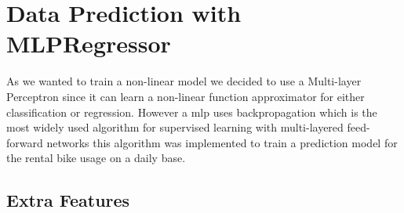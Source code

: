 
\section{Data Prediction with MLPRegressor}
As we wanted to train a non-linear model we decided to use a Multi-layer Perceptron since it can learn a non-linear function approximator for either classification or regression. However  a \acf{mlp} uses backpropagation which is the most widely used algorithm for supervised learning with multi-layered feed-forward networks \cite{riedmiller1993direct} this algorithm was implemented to train a prediction model for the rental bike usage on a daily base.
\subsection{Extra Features}

